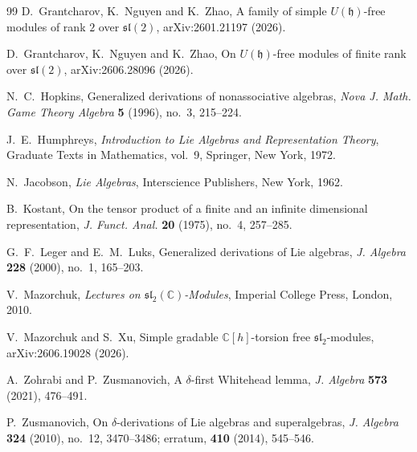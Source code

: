\documentclass[11pt,reqno]{amsart}
\numberwithin{equation}{section}
\newcommand{\C}{\mathbb C}
\newcommand{\s}{\mathfrak{sl}_2}
\theoremstyle{definition}
\theoremstyle{remark}
\begin{document}
\begin{thebibliography}{99}
D.~Grantcharov, K.~Nguyen and K.~Zhao,
A family of simple \(U(\mathfrak h)\)-free modules of rank \(2\)
over \(\mathfrak{sl}(2)\),
arXiv:2601.21197 (2026).

D.~Grantcharov, K.~Nguyen and K.~Zhao,
On \(U(\mathfrak h)\)-free modules of finite rank over
\(\mathfrak{sl}(2)\),
arXiv:2606.28096 (2026).

N.~C.~Hopkins,
Generalized derivations of nonassociative algebras,
\emph{Nova J. Math. Game Theory Algebra} \textbf{5} (1996),
no.~3, 215--224.

J.~E.~Humphreys,
\emph{Introduction to Lie Algebras and Representation Theory},
Graduate Texts in Mathematics, vol.~9,
Springer, New York, 1972.

N.~Jacobson,
\emph{Lie Algebras},
Interscience Publishers, New York, 1962.

B.~Kostant,
On the tensor product of a finite and an infinite dimensional
representation,
\emph{J. Funct. Anal.} \textbf{20} (1975), no.~4, 257--285.

G.~F.~Leger and E.~M.~Luks,
Generalized derivations of Lie algebras,
\emph{J. Algebra} \textbf{228} (2000), no.~1, 165--203.

V.~Mazorchuk,
\emph{Lectures on \(\mathfrak{sl}_2(\C)\)-Modules},
Imperial College Press, London, 2010.

V.~Mazorchuk and S.~Xu,
Simple gradable \(\C[h]\)-torsion free \(\s\)-modules,
arXiv:2606.19028 (2026).

A.~Zohrabi and P.~Zusmanovich,
A \(\delta\)-first Whitehead lemma,
\emph{J. Algebra} \textbf{573} (2021), 476--491.

P.~Zusmanovich,
On \(\delta\)-derivations of Lie algebras and superalgebras,
\emph{J. Algebra} \textbf{324} (2010), no.~12, 3470--3486;
erratum, \textbf{410} (2014), 545--546.

\end{thebibliography}
\end{document}
